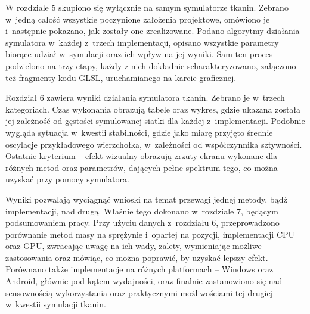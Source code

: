 	W rozdziale 5 skupiono się wyłącznie na samym symulatorze tkanin. Zebrano w~jedną całość wszystkie poczynione założenia projektowe, omówiono je i~następnie pokazano, jak zostały one zrealizowane. Podano algorytmy działania symulatora w~każdej z~trzech implementacji, opisano wszystkie parametry biorące udział w~symulacji oraz ich wpływ na jej wyniki. Sam ten proces podzielono na trzy etapy, każdy z nich dokładnie scharakteryzowano, załączono też fragmenty kodu GLSL, uruchamianego na karcie graficznej.
	
	Rozdział 6 zawiera wyniki działania symulatora tkanin. Zebrano je w~trzech kategoriach. Czas wykonania obrazują tabele oraz wykres, gdzie ukazana została jej zależność od gęstości symulowanej siatki dla każdej z~implementacji. Podobnie wygląda sytuacja w~kwestii stabilności, gdzie jako miarę przyjęto średnie oscylacje przykładowego wierzchołka, w~zależności od współczynnika sztywności. Ostatnie kryterium -- efekt wizualny obrazują zrzuty ekranu wykonane dla różnych metod oraz parametrów, dających pełne spektrum tego, co można uzyskać przy pomocy symulatora. 
	
	Wyniki pozwalają wyciągnąć wnioski na temat przewagi jednej metody, bądź implementacji, nad drugą. Właśnie tego dokonano w~rozdziale 7, będącym podsumowaniem pracy. Przy użyciu danych z~rozdziału 6, przeprowadzono porównanie metod masy na sprężynie i~opartej na pozycji, implementacji CPU oraz GPU, zwracając uwagę na ich wady, zalety, wymieniając możliwe zastosowania oraz mówiąc, co można poprawić, by uzyskać lepszy efekt. Porównano także implementacje na różnych platformach -- Windows oraz Android, głównie pod kątem wydajności, oraz finalnie zastanowiono się nad sensownością wykorzystania oraz praktycznymi możliwościami tej drugiej w~kwestii symulacji tkanin.